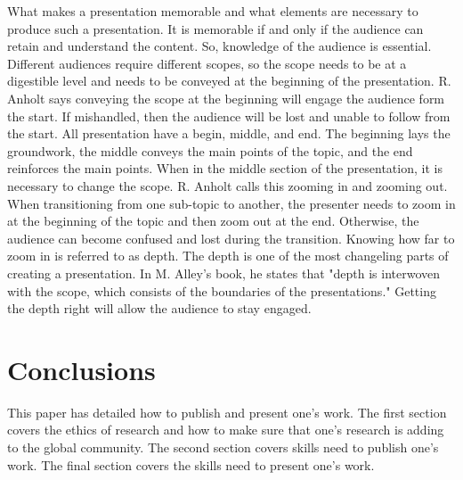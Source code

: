 \documentclass[12pt]{article}
\begin{document}
What makes a presentation memorable and what elements are necessary to produce such a presentation. It is memorable if and only if the audience can retain and understand the content. So, knowledge of the audience is essential. Different audiences require different scopes, so the scope needs to be at a digestible level and needs to be conveyed at the beginning of the presentation. R. Anholt says conveying the scope at the beginning will engage the audience form the start\cite{Anholt}. If mishandled, then the audience will be lost and unable to follow from the start. All presentation have a begin, middle, and end\cite{Anholt}\cite{Alley}. The beginning lays the groundwork, the middle conveys the main points of the topic, and the end reinforces the main points\cite{Anholt}\cite{Alley}. When in the middle section of the presentation, it is necessary to change the scope. R. Anholt calls this zooming in and zooming out\cite{Anholt}. When transitioning from one sub-topic to another, the presenter needs to zoom in at the beginning of the topic and then zoom out at the end\cite{Anholt}. Otherwise, the audience can become confused and lost during the transition. Knowing how far to zoom in is referred to as depth\cite{Alley}. The depth is one of the most changeling parts of creating a presentation\cite{Alley}. In M. Alley's book, he states that "depth is interwoven with the scope, which consists of the boundaries of the presentations.\cite{Alley}" Getting the depth right will allow the audience to stay engaged.


\section{Conclusions}

This paper has detailed how to publish and present one's work. The first section covers the ethics of research and how to make sure that one's research is adding to the global community. The second section covers skills need to publish one's work. The final section covers the skills need to present one's work.




\end{document}
